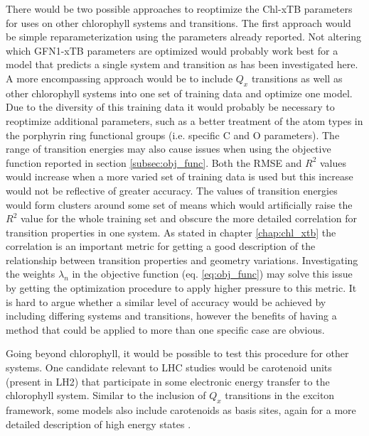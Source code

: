 There would be two possible approaches to reoptimize the Chl-xTB parameters for 
uses on other chlorophyll systems and transitions. The first approach would be 
simple reparameterization using the parameters already reported. Not altering which
GFN1-xTB parameters are optimized would probably work best for a model that predicts
a single system and transition as has been investigated here. A more encompassing 
approach would be to include $Q_x$ transitions as well as other chlorophyll systems
into one set of training data and optimize one model. Due to the diversity of this
training data it would probably be necessary to reoptimize additional parameters,
such as a better treatment of the atom types in the porphyrin ring functional groups 
(i.e. specific C and O parameters). The range of transition energies may also cause
issues when using the objective function reported in section \ref{subsec:obj_func}.
Both the RMSE and $R^2$ values would increase when a more varied set of training 
data is used but this increase would not be reflective of greater accuracy. The 
values of transition energies would form clusters around some set of means which
would artificially raise the $R^2$ value for the whole training set and obscure
the more detailed correlation for transition properties in one system. As stated
in chapter \ref{chap:chl_xtb} the correlation is an important metric for getting 
a good description of the relationship between transition properties and geometry
variations. Investigating the weights $\lambda_n$ in the objective function (eq. \ref{eq:obj_func})
may solve this issue by getting the optimization procedure to apply higher pressure
to this metric. It is hard to argue whether a similar level of accuracy would be
achieved by including differing systems and transitions, however the benefits of 
having a method that could be applied to more than one specific case are obvious.

Going beyond chlorophyll, it would be possible to test this procedure for other 
systems. One candidate relevant to LHC studies would be carotenoid units (present
in LH2) that participate in some electronic energy transfer to the chlorophyll system.
Similar to the inclusion of $Q_x$ transitions in the exciton framework, some models
also include carotenoids as basis sites, again for a more detailed description of
high energy states \cite{Polli2006, Andreussi2015}. 

